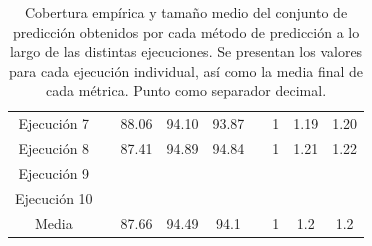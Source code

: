 \begin{table}[h]
\begin{tabular}{ccccccccc}
    Ejecución 7                      &  & 88.06                           & 94.10                         & 93.87                         &  & 1                               & 1.19                           & 1.20                           \\
    Ejecución 8                      &  & 87.41                           & 94.89                         & 94.84                         &  & 1                               & 1.21                           & 1.22                           \\
    Ejecución 9                      &  &                                 &                               &                               &  &                                 &                                &                                \\
    Ejecución 10                     &  &                                 &                               &                               &  &                                 &                                &                                \\ \cline{1-1} \cline{3-5} \cline{7-9} 
    Media                            &  & 87.66                           & 94.49                         & 94.1                          &  & 1                               & 1.2                            & 1.2                            \\ \hline
    \end{tabular}
    \caption[
        Cobertura empírica y tamaño medio del conjunto de predicción obtenidos por cada método de predicción a lo largo de las distintas ejecuciones.
    ]{   
        Cobertura empírica y tamaño medio del conjunto de predicción obtenidos por cada método de predicción a lo largo de las distintas ejecuciones. 
        Se presentan los valores para cada ejecución individual, así como la media final de cada métrica. 
        Punto como separador decimal.
    }
    \label{tab:AMM_EC_MPSS_comparative}
\end{table}




